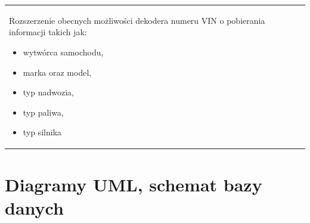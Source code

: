 \begin{center}
\begin{longtable}{|l|l|p{10cm}|}
			Rozszerzenie obecnych możliwości dekodera numeru VIN o pobierania informacji takich jak:
			\begin{itemize}
				\item wytwórca samochodu,
				\item marka oraz model,
				\item typ nadwozia,
				\item typ paliwa,
				\item typ silnika
			\end{itemize}
											\tabularnewline								
		\end{longtable}
		\label{app:changes_in_future}
	\end{center}
		
\section{Diagramy UML, schemat bazy danych}
